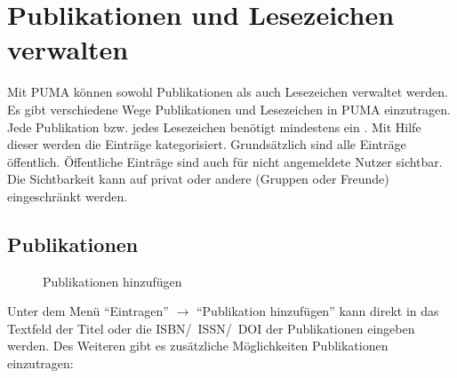 \section{Publikationen und Lesezeichen verwalten}
\label{sec:publikationen}
 Mit PUMA können sowohl Publikationen als auch Lesezeichen verwaltet werden. Es gibt verschiedene Wege Publikationen und Lesezeichen in PUMA einzutragen. Jede Publikation bzw. jedes Lesezeichen benötigt mindestens ein \tag. Mit Hilfe dieser \tags  werden die Einträge kategorisiert. Grundsätzlich sind alle Einträge öffentlich. Öffentliche Einträge sind auch für nicht angemeldete Nutzer sichtbar. Die Sichtbarkeit kann auf privat oder andere (Gruppen oder Freunde) eingeschränkt werden. 
\subsection{Publikationen}
\begin{figure}[htb]
 \centering
 \caption{Publikationen hinzufügen}
 \label{fig:publikationenHinzufügen}
\end{figure}  
Unter dem Menü \enquote{Eintragen} $\to$ \enquote{Publikation hinzufügen} kann direkt in das Textfeld der Titel oder die ISBN/~ISSN/~DOI der Publikationen eingeben werden. Des Weiteren gibt es zusätzliche Möglichkeiten Publikationen einzutragen:
